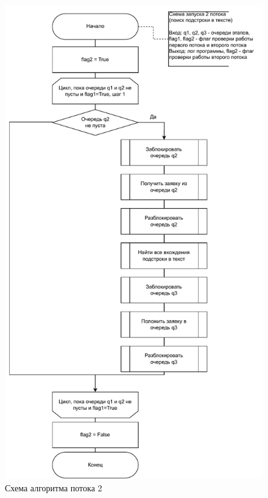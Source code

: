\begin{figure}[h]
	\centering
	\includegraphics[scale=0.8]{photos/thread2}
	\caption{Схема алгоритма потока 2}
	\label{sh2}
\end{figure}
\clearpage

